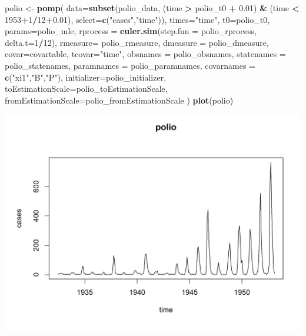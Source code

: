 \documentclass[]{article}
\newenvironment{Shaded}{\begin{snugshade}}{\end{snugshade}}
\newcommand{\KeywordTok}[1]{\textcolor[rgb]{0.13,0.29,0.53}{\textbf{#1}}}
\newcommand{\DataTypeTok}[1]{\textcolor[rgb]{0.13,0.29,0.53}{#1}}
\newcommand{\DecValTok}[1]{\textcolor[rgb]{0.00,0.00,0.81}{#1}}
\newcommand{\FloatTok}[1]{\textcolor[rgb]{0.00,0.00,0.81}{#1}}
\newcommand{\StringTok}[1]{\textcolor[rgb]{0.31,0.60,0.02}{#1}}
\newcommand{\OperatorTok}[1]{\textcolor[rgb]{0.81,0.36,0.00}{\textbf{#1}}}
\newcommand{\NormalTok}[1]{#1}
\begin{document}
\begin{Shaded}
\begin{Highlighting}[]
\NormalTok{polio <-}\StringTok{ }\KeywordTok{pomp}\NormalTok{(}
  \DataTypeTok{data=}\KeywordTok{subset}\NormalTok{(polio_data, }
\NormalTok{              (time }\OperatorTok{>}\StringTok{ }\NormalTok{polio_t0 }\OperatorTok{+}\StringTok{ }\FloatTok{0.01}\NormalTok{) }\OperatorTok{&}\StringTok{ }\NormalTok{(time }\OperatorTok{<}\StringTok{ }\DecValTok{1953}\OperatorTok{+}\DecValTok{1}\OperatorTok{/}\DecValTok{12}\OperatorTok{+}\FloatTok{0.01}\NormalTok{),   }
              \DataTypeTok{select=}\KeywordTok{c}\NormalTok{(}\StringTok{"cases"}\NormalTok{,}\StringTok{"time"}\NormalTok{)),}
  \DataTypeTok{times=}\StringTok{"time"}\NormalTok{,}
  \DataTypeTok{t0=}\NormalTok{polio_t0,}
  \DataTypeTok{params=}\NormalTok{polio_mle,}
  \DataTypeTok{rprocess =} \KeywordTok{euler.sim}\NormalTok{(}\DataTypeTok{step.fun =}\NormalTok{ polio_rprocess, }\DataTypeTok{delta.t=}\DecValTok{1}\OperatorTok{/}\DecValTok{12}\NormalTok{),}
  \DataTypeTok{rmeasure=}\NormalTok{ polio_rmeasure,}
  \DataTypeTok{dmeasure =}\NormalTok{ polio_dmeasure,}
  \DataTypeTok{covar=}\NormalTok{covartable,}
  \DataTypeTok{tcovar=}\StringTok{"time"}\NormalTok{,}
  \DataTypeTok{obsnames =}\NormalTok{ polio_obsnames,}
  \DataTypeTok{statenames =}\NormalTok{ polio_statenames,}
  \DataTypeTok{paramnames =}\NormalTok{ polio_paramnames,}
  \DataTypeTok{covarnames =} \KeywordTok{c}\NormalTok{(}\StringTok{"xi1"}\NormalTok{,}\StringTok{"B"}\NormalTok{,}\StringTok{"P"}\NormalTok{),}
  \DataTypeTok{initializer=}\NormalTok{polio_initializer,}
  \DataTypeTok{toEstimationScale=}\NormalTok{polio_toEstimationScale, }
  \DataTypeTok{fromEstimationScale=}\NormalTok{polio_fromEstimationScale}
\NormalTok{)}
\KeywordTok{plot}\NormalTok{(polio)}
\end{Highlighting}
\end{Shaded}

\begin{center}\includegraphics{figure/sp500-pomp-1} \end{center}
\end{document}

